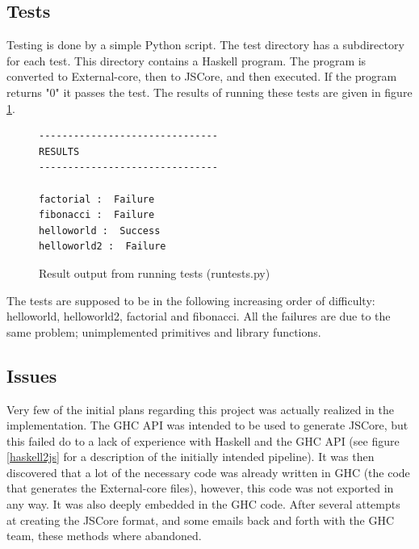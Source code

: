 \subsection{Tests}

Testing is done by a simple Python script. The test directory has a subdirectory 
for each test. This directory
contains a Haskell program. The program is converted to External-core, then 
to JSCore, and then executed.
If the program returns "0" it passes the test. The results of running these 
tests are given in figure \ref{tests}.


\begin{figure}[H]
\begin{center}
\begin{minipage}{0.45\textwidth}
\begin{lstlisting}
-------------------------------
RESULTS
-------------------------------

factorial :  Failure
fibonacci :  Failure
helloworld :  Success
helloworld2 :  Failure
\end{lstlisting}
\end{minipage}
\end{center}
\caption[Result output from running tests]{Result output from running tests (runtests.py)}
\label{tests}
\end{figure}

The tests are supposed to be in the following increasing order of difficulty: 
helloworld, helloworld2, factorial and fibonacci. 
All the failures are due to the same problem; unimplemented 
primitives and library functions.

\subsection{Issues}


Very few of the initial plans regarding this project was actually realized in 
the implementation. The GHC API was intended to be used to generate JSCore, 
but this failed do to a lack of experience with Haskell and the GHC API 
(see figure \ref{haskell2js} for a description of the initially intended
pipeline). It was then discovered that a lot of the necessary code was already
written in GHC (the code that generates the External-core files), however, 
this code was not exported in any way. It was also deeply embedded in the GHC 
code. After several attempts at creating the JSCore format, and some emails back 
and forth with the GHC team, these methods where abandoned.


